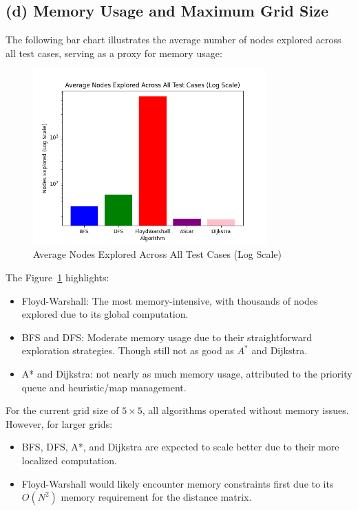 \documentclass[12pt]{article}
\begin{document}
\subsection{(d) Memory Usage and Maximum Grid Size}
The following bar chart illustrates the average number of nodes explored across all test cases, serving as a proxy for memory usage:

\begin{figure}[h!]
    \centering
    \includegraphics[width=0.8\textwidth]{average_nodes_explored_log.png}
    \caption{Average Nodes Explored Across All Test Cases (Log Scale)}
    \label{fig:nodes_explored}
\end{figure}

\noindent The Figure~\ref{fig:nodes_explored} highlights:
\begin{itemize}
    \item Floyd-Warshall: The most memory-intensive, with thousands of nodes explored due to its global computation.
    \item BFS and DFS: Moderate memory usage due to their straightforward exploration strategies. Though still not as good as $A^*$ and Dijkstra.
    \item A* and Dijkstra: not nearly as much memory usage, attributed to the priority queue and heuristic/map management.
\end{itemize}

\noindent For the current grid size of \( 5 \times 5 \), all algorithms operated without memory issues. However, for larger grids:
\begin{itemize}
    \item BFS, DFS, A*, and Dijkstra are expected to scale better due to their more localized computation.
    \item Floyd-Warshall would likely encounter memory constraints first due to its \( O(N^2) \) memory requirement for the distance matrix.
\end{itemize}
\end{document}
